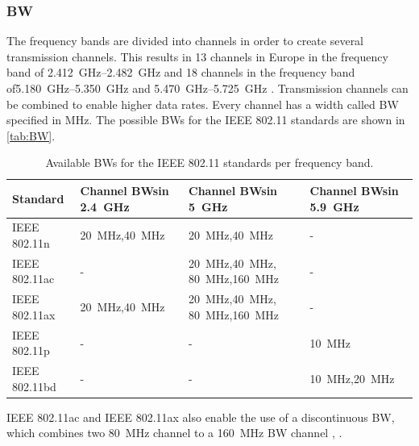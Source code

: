 \subsubsection*{\acf{BW}}
The frequency bands are divided into channels in order to create several transmission channels.
This results in 13 channels in Europe in the frequency band of \SIrange{2.412}{2.482}{\giga\hertz} and 18 channels in the frequency band of\newline \SIrange{5.180}{5.350}{\giga\hertz} and \SIrange{5.470}{5.725}{\giga\hertz} \cite[274]{sauter_wireless_2022}.
Transmission channels can be combined to enable higher data rates.
Every channel has a width called \ac{BW} specified in \si{\mega\hertz}.
The possible \ac{BW}s for the IEEE 802.11 standards are shown in \autoref{tab:BW}.
\begin{table}[!ht]
	\centering
	\begin{tabular}{>{\raggedright}p{2.2cm}p{2.50cm}p{2.55cm}p{2.50cm}}
		\toprule
		Standard & Channel \ac{BW}s\newline in \SI{2.4}{\giga\hertz}& Channel \ac{BW}s\newline in \SI{5}{\giga\hertz} &  Channel \ac{BW}s\newline in  \SI{5.9}{\giga\hertz}\\
		\midrule
		IEEE 802.11n \cite[299]{sauter_wireless_2022}& \SI{20}{\mega\hertz},\SI{40}{\mega\hertz}  & \SI{20}{\mega\hertz},\SI{40}{\mega\hertz} & - \\
		\midrule
		IEEE 802.11ac \cite{ieee_standard_2020}& -  & \SI{20}{\mega\hertz},\SI{40}{\mega\hertz}, \SI{80}{\mega\hertz},\SI{160}{\mega\hertz} & - \\
		\midrule
		IEEE 802.11ax \cite{ieee_standard_2021ax}&\SI{20}{\mega\hertz},\SI{40}{\mega\hertz}  & \SI{20}{\mega\hertz},\SI{40}{\mega\hertz}, \SI{80}{\mega\hertz},\SI{160}{\mega\hertz} & - \\
		\midrule
		IEEE 802.11p \cite{jacob_system-level_2020}& - & - & \SI{10}{\mega\hertz} \\
		\midrule
		IEEE 802.11bd \cite{jacob_system-level_2020}& - & - & \SI{10}{\mega\hertz},\SI{20}{\mega\hertz} \\
		\bottomrule
	\end{tabular}
	\caption{Available \ac{BW}s for the IEEE 802.11 standards per frequency band.}
	\label{tab:BW}
\end{table}

IEEE 802.11ac and IEEE 802.11ax also enable the use of a discontinuous \ac{BW}, which combines two \SI{80}{\mega\hertz}
channel to a \SI{160}{\mega\hertz} \ac{BW} channel \cite{ieee_standard_2021ax}, \cite{ieee_standard_2020}.

